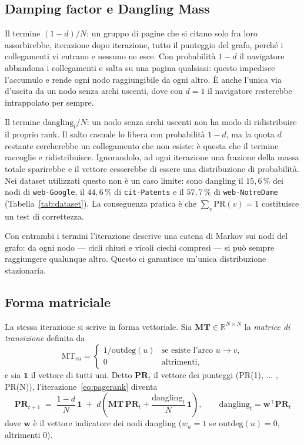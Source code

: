 \documentclass[11pt,a4paper]{article}
\newcommand{\stacco}{\par\medskip\noindent}
\begin{document}
\subsection{Damping factor e Dangling Mass}
\label{sec:damping_dangling}
\stacco
Il termine $(1-d)/N$: un gruppo di pagine che si citano solo fra loro assorbirebbe, iterazione dopo
iterazione, tutto il punteggio del grafo, perché i collegamenti vi entrano
e nessuno ne esce. Con probabilità $1-d$ il navigatore abbandona i
collegamenti e salta su una pagina qualsiasi: questo impedisce l'accumulo e
rende ogni nodo raggiungibile da ogni altro. È anche l'unica via
d'uscita da un nodo senza archi uscenti, dove con $d=1$ il navigatore
resterebbe intrappolato per sempre.

\stacco
Il termine $\mathrm{dangling}_t/N$: un nodo senza archi uscenti non ha modo di ridistribuire il
proprio rank. Il salto casuale lo libera con probabilità $1-d$, ma la
quota $d$ restante cercherebbe un collegamento che non esiste: è questa
che il termine raccoglie e ridistribuisce. Ignorandolo, ad ogni iterazione una frazione della massa
totale sparirebbe e il vettore cesserebbe di essere una distribuzione di
probabilità. Nei dataset utilizzati questo non è un caso limite: sono
dangling il $15{,}6\,\%$ dei nodi di \texttt{web-Google}, il $44{,}6\,\%$ di
\texttt{cit-Patents} e il $57{,}7\,\%$ di \texttt{web-NotreDame}
(Tabella~\ref{tab:dataset}).
La conseguenza pratica è che $\sum_v \mathrm{PR}(v) = 1$ costituisce un test di
correttezza.

\stacco
Con entrambi i termini l'iterazione descrive una catena di Markov sui nodi
del grafo: da ogni nodo --- cicli chiusi e
vicoli ciechi compresi --- si può sempre raggiungere qualunque altro. Questo ci
garantisce un'unica distribuzione stazionaria.

\subsection{Forma matriciale}
\label{sec:matriciale}

La stessa iterazione si scrive in forma vettoriale. Sia $\mathbf{MT} \in \mathbb{R}^{N \times N}$ la \emph{matrice di
transizione} definita da
\begin{equation}
\mathrm{MT}_{vu} =
\begin{cases}
1/\mathrm{outdeg}(u) & \text{se esiste l'arco } u \to v,\\[2pt]
0 & \text{altrimenti,}
\end{cases}
\end{equation}
e sia $\mathbf{1}$ il vettore di tutti uni. Detto $\mathbf{PR}_t$ il
vettore dei punteggi (PR(1), ... , PR(N)), l'iterazione~\eqref{eq:pagerank} diventa
\begin{equation}
\mathbf{PR}_{t+1} \;=\; \frac{1-d}{N}\,\mathbf{1}
\;+\; d\left( \mathbf{MT}\,\mathbf{PR}_t + \frac{\mathrm{dangling}_t}{N}\,\mathbf{1} \right),
\qquad \mathrm{dangling}_t = \mathbf{w}^{\!\top} \mathbf{PR}_t
\label{eq:matriciale}
\end{equation}
dove $\mathbf{w}$ è il vettore indicatore dei nodi dangling ($w_u=1$ se
$\mathrm{outdeg}(u)=0$, altrimenti $0$).
\end{document}

